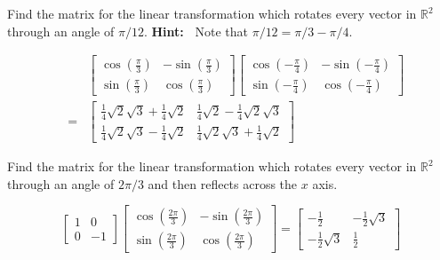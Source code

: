 \documentclass{ximera}
\begin{document}
\begin{problem}\label{prb:6.15} Find the matrix for the linear transformation which rotates every
vector in $\mathbb{R}^{2}$ through an angle of $\pi /12.$ \textbf{Hint:\ }
Note that $\pi /12=\pi /3-\pi /4.$
\begin{hint}
\begin{eqnarray*}
&&\left[
\begin{array}{cc}
\cos \left( \frac{\pi }{3}\right)  & -\sin \left( \frac{\pi }{3}\right)  \\
\sin \left( \frac{\pi }{3}\right)  & \cos \left( \frac{\pi }{3}\right)
\end{array}
\right] \left[
\begin{array}{cc}
\cos \left( -\frac{\pi }{4}\right)  & -\sin \left( -\frac{\pi }{4}\right)
\\
\sin \left( -\frac{\pi }{4}\right)  & \cos \left( -\frac{\pi }{4}\right)
\end{array}
\right]  \\
&=&\left[
\begin{array}{cc}
\frac{1}{4}\sqrt{2}\sqrt{3}+\frac{1}{4}\sqrt{2} & \frac{1}{4}\sqrt{2}-\frac{1
}{4}\sqrt{2}\sqrt{3} \\
\frac{1}{4}\sqrt{2}\sqrt{3}-\frac{1}{4}\sqrt{2} & \frac{1}{4}\sqrt{2}\sqrt{3}
+\frac{1}{4}\sqrt{2}
\end{array}
\right]
\end{eqnarray*}
\end{hint}
\end{problem}

\begin{problem}\label{prb:6.16} Find the matrix for the linear transformation which rotates every
vector in $\mathbb{R}^{2}$ through an angle of $2\pi /3$ and then reflects
across the $x$ axis.
\begin{hint}
\[
\left[
\begin{array}{rr}
1 & 0 \\
0 & -1
\end{array}
\right] \left[
\begin{array}{cc}
\cos \left( \frac{2\pi }{3}\right)  & -\sin \left( \frac{2\pi }{3}\right)
\\
\sin \left( \frac{2\pi }{3}\right)  & \cos \left( \frac{2\pi }{3}\right)
\end{array}
\right] = \left[
\begin{array}{cc}
-\frac{1}{2} & -\frac{1}{2}\sqrt{3} \\
-\frac{1}{2}\sqrt{3} & \frac{1}{2}
\end{array}
\right]
\]
\end{hint}
\end{problem}
\end{document}
